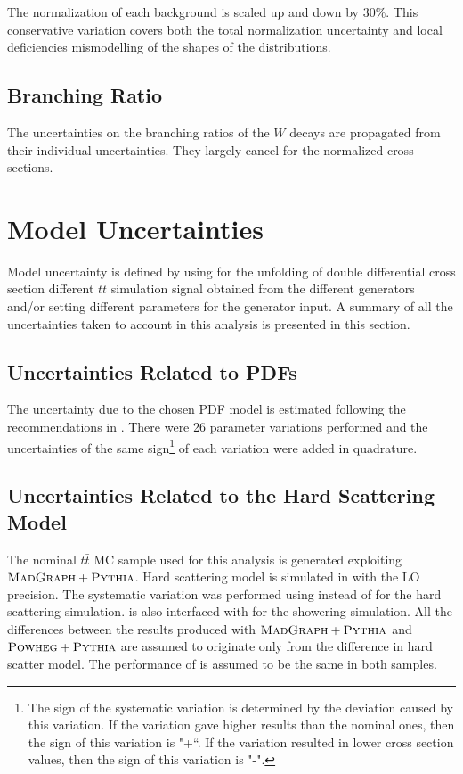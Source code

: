 The normalization of each background is scaled up and down by 30$\%$\cite{Asin2014Auth}. This conservative variation covers both the 
total normalization uncertainty and local deficiencies mismodelling of the shapes of the distributions. 

\subsection{Branching Ratio}

The uncertainties on the branching ratios of the $W$ decays are propagated from their individual uncertainties.
They largely cancel for the normalized cross sections.
\section{Model Uncertainties}

Model uncertainty is defined by using for the unfolding of double differential cross section different $t\bar{t}$ simulation signal 
obtained from the different generators and/or setting
different parameters for the generator input. A summary of all the uncertainties taken to account in this analysis is presented 
in this section.

\subsection{Uncertainties Related to PDFs}

The uncertainty due to the chosen PDF model is estimated following the recommendations in \cite{Lai:2010vv}. There were 26 parameter variations
performed and the uncertainties of the same sign\footnote{The sign of the systematic variation is determined by the deviation caused by this
variation. If the variation gave higher results than the nominal ones, then the sign of this variation is "+``. If the variation resulted
in lower cross section values, then the sign of this variation is "-".} of each variation were added in quadrature.

\subsection{Uncertainties Related to the Hard Scattering Model}

The nominal $t\bar{t}$ MC sample used for this analysis is generated exploiting $\textsc{MadGraph}+\textsc{Pythia}$. Hard scattering model is simulated
in \MG with the LO precision. The systematic variation was performed using \Powheg instead of \MG for the hard scattering simulation.
\Powheg is also interfaced with \PYTHIA for the showering simulation. All the differences between the results produced with $\textsc{MadGraph}+\textsc{Pythia}$
and $\textsc{Powheg}+\textsc{Pythia}$ are assumed to originate only from the difference in hard scatter model. The performance of \PYTHIA is assumed 
to be the same in both samples.

